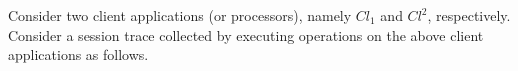 \documentclass[journal,compsoc]{IEEEtran}
\begin{document}
    \par  Consider two client applications (or processors), namely $\mathit{Cl}_1$ and $\mathit{Cl}^2$,
  respectively. Consider a session trace collected by executing operations on the above client  applications as follows.
\end{document}
